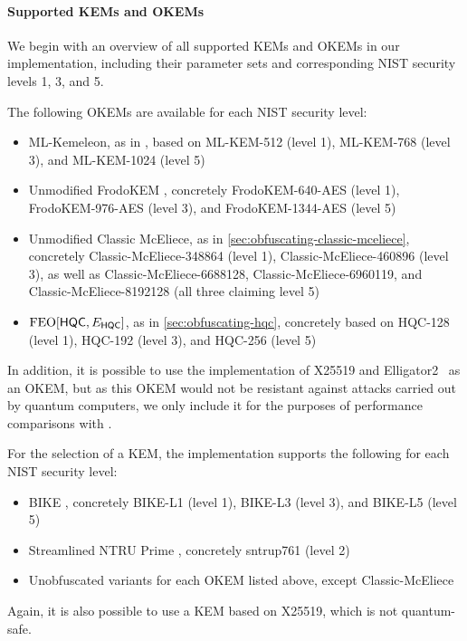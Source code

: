 \paragraph{Supported KEMs and OKEMs}
We begin with an overview of all supported KEMs and OKEMs in our implementation, including their parameter sets and corresponding NIST security levels 1, 3, and 5.

The following OKEMs are available for each NIST security level:
\begin{itemize}
    \item ML-Kemeleon, as in \cite{irtf-cfrg-kemeleon-00}, based on ML-KEM-512 (level 1), ML-KEM-768 (level 3), and ML-KEM-1024 (level 5)
    \item Unmodified FrodoKEM \cite{NISTPQC-R3:FrodoKEM20}, concretely FrodoKEM-640-AES (level 1), FrodoKEM-976-AES (level 3), and FrodoKEM-1344-AES (level 5)
    \item Unmodified Classic McEliece, as in \cref{sec:obfuscating-classic-mceliece}, concretely Classic-McEliece-348864 (level 1), Classic-McEliece-460896 (level 3), as well as Classic-McEliece-6688128, Classic-McEliece-6960119, and Classic-McEliece-8192128 (all three claiming level 5)
    \item $\textsf{\textnormal{FEO}}[\mathsf{HQC}, E_\mathsf{HQC}]$, as in \cref{sec:obfuscating-hqc}, concretely based on HQC-128 (level 1), HQC-192 (level 3), and HQC-256 (level 5)
\end{itemize}

In addition, it is possible to use the implementation of X25519 and \textsf{Elligator2}~\cite{CCS:BHKL13} as an OKEM, but as this OKEM would not be resistant against attacks carried out by quantum computers, we only include it for the purposes of performance comparisons with \obfsfour{}.

For the selection of a KEM, the implementation supports the following for each NIST security level:
\begin{itemize}
    \item BIKE \cite{NISTPQC-R4:BIKE22}, concretely BIKE-L1 (level 1), BIKE-L3 (level 3), and BIKE-L5 (level 5)
    \item Streamlined NTRU Prime \cite{NISTPQC-R3:NTRUPrime20}, concretely sntrup761 (level 2)
    \item Unobfuscated variants for each OKEM listed above, except Classic-McEliece
\end{itemize}

Again, it is also possible to use a KEM based on X25519, which is not quantum-safe.

